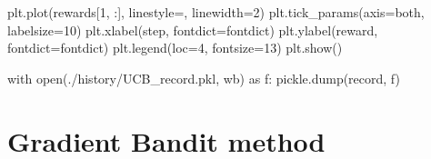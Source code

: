 \documentclass[
  letterpaper,
]{krantz}
\makeatletter
\newenvironment{Shaded}{\begin{snugshade}}{\end{snugshade}}
\newcommand{\BuiltInTok}[1]{\textcolor[rgb]{0.00,0.23,0.31}{#1}}
\newcommand{\ControlFlowTok}[1]{\textcolor[rgb]{0.00,0.23,0.31}{#1}}
\newcommand{\DecValTok}[1]{\textcolor[rgb]{0.68,0.00,0.00}{#1}}
\newcommand{\ImportTok}[1]{\textcolor[rgb]{0.00,0.46,0.62}{#1}}
\newcommand{\NormalTok}[1]{\textcolor[rgb]{0.00,0.23,0.31}{#1}}
\newcommand{\OperatorTok}[1]{\textcolor[rgb]{0.37,0.37,0.37}{#1}}
\newcommand{\StringTok}[1]{\textcolor[rgb]{0.13,0.47,0.30}{#1}}
\newenvironment{kframe}{%
\medskip{}
\setlength{\fboxsep}{.8em}
 \def\at@end@of@kframe{}%
 \ifinner\ifhmode%
  \def\at@end@of@kframe{\end{minipage}}%
  \begin{minipage}{\columnwidth}%
 \fi\fi%
 \def\FrameCommand##1{\hskip\@totalleftmargin \hskip-\fboxsep
 \colorbox{shadecolor}{##1}\hskip-\fboxsep
     \hskip-\linewidth \hskip-\@totalleftmargin \hskip\columnwidth}%
 \MakeFramed {\advance\hsize-\width
   \@totalleftmargin\z@ \linewidth\hsize
   \@setminipage}}%
 {\par\unskip\endMakeFramed%
 \at@end@of@kframe}
\renewenvironment{Shaded}{\begin{kframe}}{\end{kframe}}
\theoremstyle{plain}
\theoremstyle{definition}
\theoremstyle{definition}
\theoremstyle{remark}
\makeatother
\begin{document}
\begin{codelisting}
\begin{Shaded}
\begin{Highlighting}[]
\NormalTok{    plt.plot(rewards[}\DecValTok{1}\NormalTok{, :], linestyle}\OperatorTok{=}\StringTok{\textquotesingle{}{-}\textquotesingle{}}\NormalTok{, linewidth}\OperatorTok{=}\DecValTok{2}\NormalTok{)}
\NormalTok{    plt.tick\_params(axis}\OperatorTok{=}\StringTok{\textquotesingle{}both\textquotesingle{}}\NormalTok{, labelsize}\OperatorTok{=}\DecValTok{10}\NormalTok{)}
\NormalTok{    plt.xlabel(}\StringTok{\textquotesingle{}step\textquotesingle{}}\NormalTok{, fontdict}\OperatorTok{=}\NormalTok{fontdict)}
\NormalTok{    plt.ylabel(}\StringTok{\textquotesingle{}reward\textquotesingle{}}\NormalTok{, fontdict}\OperatorTok{=}\NormalTok{fontdict)}
\NormalTok{    plt.legend(loc}\OperatorTok{=}\DecValTok{4}\NormalTok{, fontsize}\OperatorTok{=}\DecValTok{13}\NormalTok{)}
\NormalTok{plt.show()}

\ControlFlowTok{with} \BuiltInTok{open}\NormalTok{(}\StringTok{\textquotesingle{}./history/UCB\_record.pkl\textquotesingle{}}\NormalTok{, }\StringTok{\textquotesingle{}wb\textquotesingle{}}\NormalTok{) }\ImportTok{as}\NormalTok{ f:}
\NormalTok{    pickle.dump(record, f)}
\end{Highlighting}
\end{Shaded}

\end{codelisting}

\section{Gradient Bandit method}\label{gradient-bandit-method}
\end{document}
